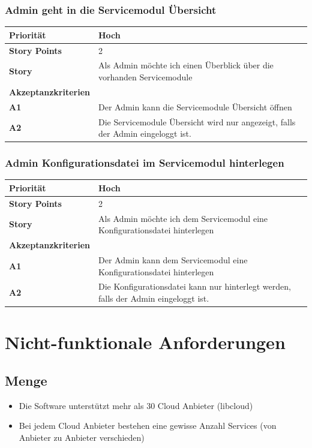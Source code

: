 \documentclass[11pt]{scrartcl}
\begin{document}
 \subsubsection{Admin geht in die Servicemodul Übersicht}
 
     \begin{tabularx}{\linewidth}{l X}
  \textbf{Priorität} & Hoch\\
  \hline
  \textbf{Story Points} & 2\\
  \hline
  \textbf{Story}& Als Admin möchte ich einen Überblick über die vorhanden Servicemodule\\
  \hline
    \textbf{Akzeptanzkriterien} & \\
    \hline
      \textbf{A1} & Der Admin kann die Servicemodule Übersicht öffnen\\
  \hline
    \textbf{A2} & Die Servicemodule Übersicht wird nur angezeigt, falls der Admin eingeloggt ist.\\
  \hline
 \end{tabularx}


 \subsubsection{Admin Konfigurationsdatei im Servicemodul hinterlegen}
     \begin{tabularx}{\linewidth}{l X}
  \textbf{Priorität} & Hoch\\
  \hline
  \textbf{Story Points} & 2\\
  \hline
  \textbf{Story}& Als Admin möchte ich dem Servicemodul eine Konfigurationsdatei hinterlegen\\
  \hline
    \textbf{Akzeptanzkriterien} & \\
    \hline
      \textbf{A1} & Der Admin kann dem Servicemodul eine Konfigurationsdatei hinterlegen\\
  \hline
    \textbf{A2} & Die Konfigurationsdatei kann nur hinterlegt werden, falls der Admin eingeloggt ist.\\
  \hline
 \end{tabularx}

\newpage

\section{Nicht-funktionale Anforderungen}
\subsection{Menge}
\begin{itemize}
  \item Die Software unterstützt mehr als 30 Cloud Anbieter (libcloud)
  \item Bei jedem Cloud Anbieter bestehen eine gewisse Anzahl Services (von Anbieter zu Anbieter verschieden)
\end{itemize}
\end{document}
